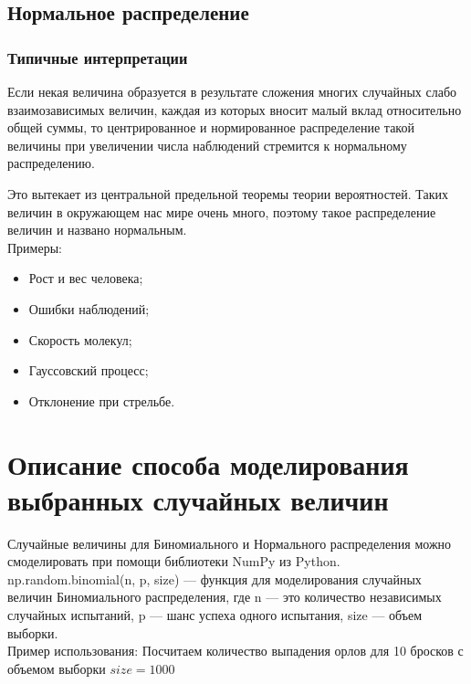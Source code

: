 \documentclass[a4paper]{article}
\begin{document}
\subsection{Нормальное распределение}

\subsubsection{Типичные интерпретации}

Если некая величина образуется в результате сложения многих случайных слабо взаимозависимых величин, каждая из которых вносит малый вклад относительно общей суммы, то центрированное и нормированное распределение такой величины при увеличении числа наблюдений стремится к нормальному распределению.

Это вытекает из центральной предельной теоремы теории вероятностей. Таких величин в окружающем нас мире очень много, поэтому такое распределение величин и названо нормальным. \\
Примеры:
\begin{itemize}
    \item Рост и вес человека;
    \item Ошибки наблюдений;
    \item Скорость молекул;
    \item Гауссовский процесс;
    \item Отклонение при стрельбе.
\end{itemize}

\section{Описание способа моделирования выбранных случайных величин}
Случайные величины для Биномиального и Нормального распределения можно смоделировать при помощи библиотеки NumPy из Python.\\

np.random.binomial(n, p, size) --- функция для моделирования случайных величин Биномиального распределения, где n --- это количество независимых случайных испытаний, p --- шанс успеха 
одного испытания, size --- объем выборки.\\
Пример использования: Посчитаем количество выпадения орлов для 10 бросков с объемом выборки $size=1000$
\end{document}
